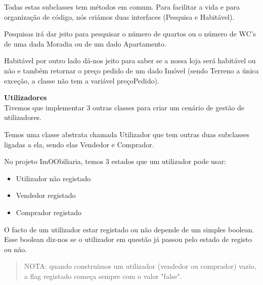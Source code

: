 \documentclass[12pt]{article}
\begin{document}
Todas estas subclasses tem métodos em comum. Para facilitar a vida e para organização de código, nós criámos duas interfaces (Pesquisa e Habitável).
\newline
\newline

Pesquisas irá dar jeito para pesquisar o número de quartos ou o número de WC's de uma dada Moradia ou de um dado Apartamento.
\newline

Habitável por outro lado dá-nos jeito para saber se a nossa loja será habitável ou não e também retornar o preço pedido de um dado Imóvel (sendo Terreno a única exceção, a classe não tem a variável preçoPedido).    

\pagebreak

\textbf{Utilizadores}
~\\

Tivemos que implementar 3 outras classes para criar um cenário de gestão de utilizadores. 
\newline

Temos uma classe abstrata chamada Utilizador que tem outras duas subclasses ligadas a ela, sendo elas Vendedor e Comprador.
\newline

No projeto ImOObiliaria, temos 3 estados que um utilizador pode usar:
\newline
\begin{itemize}
\item Utilizador não registado
\item Vendedor registado
\item Comprador registado
\end{itemize}

O facto de um utilizador estar registado ou não depende de um simples boolean.\\ 

Esse boolean diz-nos se o utilizador em questão já passou pelo estado de registo ou não.
~\\
\newline
\begin{quote}
NOTA: quando construímos um utilizador (vendedor ou comprador) vazio, a flag registado começa sempre com o valor "false".
\end{quote}

~\\
\end{document}
